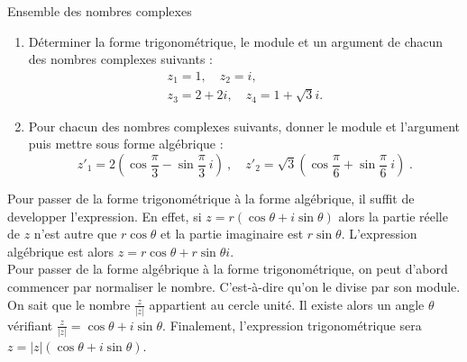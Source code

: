 \begin{chapter}{Ensemble des nombres complexes}
\begin{exe}
	\label{exe:trigo-alg}
	\begin{enumerate}
				\item D\'eterminer la forme trigonom\'etrique, le module et un argument
				      de chacun des nombres complexes suivants :
	            		\[
	            		\begin{gathered}
	            		z_1=1,\quad z_2=i,\\
	            		z_3=2+2i,\quad z_4=1+\sqrt{3}i.
	            		\end{gathered}
	            		\]
		\item Pour chacun des nombres complexes suivants, 
		      donner le module et l'argument puis mettre sous forme alg\'ebrique :
		      \[ z'_1 = 2 \left(\cos \frac{\pi}{3} - \sin \frac{\pi}{3} \ i \right) \ , \quad 
		      z'_2 = \sqrt{3} \left(\cos \frac{\pi}{6} + \sin \frac{\pi}{6} \ i \right) \;. \]
	\end{enumerate}
\end{exe}
%

\begin{rmk}
Pour passer de la forme trigonom\'etrique \`a la forme alg\'ebrique, il suffit de developper l'expression. 
En effet, si $z = r (\cos \theta + i \sin \theta)$ alors 
la partie r\'eelle de $z$ n'est autre que $r \cos \theta$ et la partie imaginaire est $r \sin \theta$. 
L'expression alg\'ebrique est alors $z = r \cos \theta + r \sin \theta i$. \\
Pour passer de la forme alg\'ebrique \`a la forme trigonom\'etrique, on peut d'abord commencer par normaliser le nombre. 
C'est-\`a-dire qu'on le divise par son module. 
On sait que le nombre $\frac{z}{|z|}$ appartient au cercle unit\'e.
Il existe alors un angle $\theta$ v\'erifiant $\frac{z}{|z|} = \cos \theta + i \sin \theta$.
Finalement, l'expression trigonom\'etrique sera $z = |z| (\cos \theta + i \sin \theta)$.
\end{rmk}


\end{chapter}
